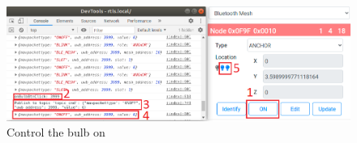 \documentclass[\main/main.tex]{subfiles}
\begin{document}
\begin{figure}[H]
    \centering
    \includegraphics[width=1\textwidth]{result_remote_control_on_gui.png}
    \caption{Control the bulb on}
    \label{fig:result_remote_control_on_gui}
\end{figure}


\end{document}
